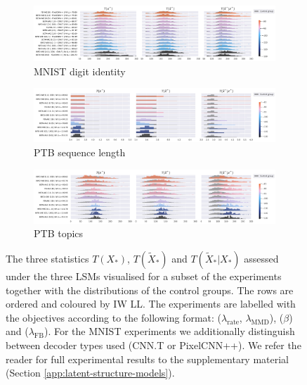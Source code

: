 \begin{figure}[t]
     \centering
     \begin{subfigure}{\textwidth}
         \centering
         \includegraphics[width=\textwidth]{images/surprisal_dists/mnist_surprisal_dist_SMALL_SELECT.png}
         \caption{MNIST digit identity}
         \label{fig:all-surprisal-dists-sub-mnist}
     \end{subfigure}
     \begin{subfigure}{\textwidth}
         \centering
         \includegraphics[width=\textwidth]{images/surprisal_dists/ptb_seq_len_surprisal_dist_SMALL_SELECT.png}
         \caption{PTB sequence length}
         \label{fig:all-surprisal-dists-sub-ptb-seq-len}
     \end{subfigure}
     \begin{subfigure}{\textwidth}
         \centering
         \includegraphics[width=\textwidth]{images/surprisal_dists/ptb_lda_topics_surprisal_dist_SMALL_SELECT.png}
         \caption{PTB topics}
         \label{fig:all-surprisal-dists-sub-ptb-topics}
     \end{subfigure}
        \caption{The three statistics $T(X_*)$, $T(\tilde X_*)$ and $T(\tilde X_*|X_*)$ assessed under the three LSMs visualised for a subset of the experiments together with the distributions of the control groups. The rows are ordered and coloured by IW LL. The experiments are labelled with the objectives according to the following format: \infovae ($\lambda_{\text{rate}}$, $\lambda_{\text{MMD}}$), \betavae ($\beta$) and \fbvae ($\lambda_{\text{FB}}$). For the MNIST experiments we additionally distinguish between decoder types used (CNN.T or PixelCNN++). We refer the reader for full experimental results to the supplementary material (Section \ref{app:latent-structure-models}).}
        \label{fig:all-surprisal-dists}
\end{figure}

